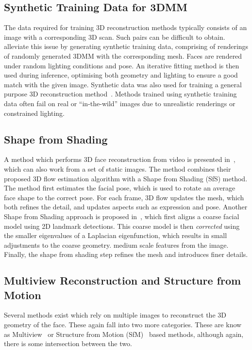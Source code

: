 \subsection{Synthetic Training Data for 3DMM}
The data required for training 3D reconstruction methods typically
consists of an image with a corresponding 3D scan. Such pairs can be
difficult to obtain. \cite{richardson20163d} alleviate this issue by
generating synthetic training data, comprising of renderings of
randomly generated 3DMM with the corresponding mesh. Faces are
rendered under random lighting conditions and pose. An iterative
fitting method is then used during inference, optimising both geometry
and lighting to ensure a good match with the given image. Synthetic
data was also used for training a general purpose 3D reconstruction
method~\cite{li2015joint}. Methods trained using synthetic training
data often fail on real or ``in-the-wild'' images due to unrealistic
renderings or constrained lighting.



\subsection{Shape from Shading}
A method which performs 3D face reconstruction from video is presented
in~\cite{suwajanakorn2014total}, which can also work from a set of
static images. The method combines their proposed 3D flow estimation
algorithm with a Shape from Shading (SfS) method. The method first
estimates the facial pose, which is used to rotate an average face
shape to the correct pose. For each frame, 3D flow updates the mesh,
which both refines the detail, and updates aspects such as expression
and pose. Another Shape from Shading approach is proposed
in~\cite{jiang20183d}, which first aligns a coarse facial model using
2D landmark detections. This coarse model is then \textit{corrected}
using the smaller eigenvalues of a Laplacian eigenfunction, which
results in small adjustments to the coarse geometry.  medium scale
features from the image. Finally, the shape from shading step refines
the mesh and introduces finer details.

\subsection{Multiview Reconstruction and Structure from Motion}

Several methods exist which rely on multiple images to reconstruct the
3D geometry of the face. These again fall into two more
categories. These are know as Multiview~\cite{mayo20093d,dou2018multi}
or Structure from Motion
(SfM)~\cite{dou2018multi,dai2018coarse,Piotraschke_2016_CVPR} based
methods, although again, there is some intersection between the two.

